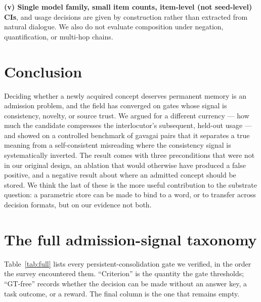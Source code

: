 \documentclass[11pt]{article}
\begin{document}
\textbf{(v) Single model family, small item counts, item-level (not seed-level) CIs}, and
usage decisions are given by construction rather than extracted from natural dialogue. We
also do not evaluate composition under negation, quantification, or multi-hop chains.

\section{Conclusion}

Deciding whether a newly acquired concept deserves permanent memory is an admission
problem, and the field has converged on gates whose signal is consistency, novelty, or
source trust. We argued for a different currency --- how much the candidate compresses the
interlocutor's subsequent, held-out usage --- and showed on a controlled benchmark of
gavagai pairs that it separates a true meaning from a self-consistent misreading where the
consistency signal is systematically inverted. The result comes with three preconditions
that were not in our original design, an ablation that would otherwise have produced a false
positive, and a negative result about where an admitted concept should be stored. We think
the last of these is the more useful contribution to the substrate question: a parametric
store can be made to bind to a word, or to transfer across decision formats, but on our
evidence not both.


\appendix
\section{The full admission-signal taxonomy}
\label{app:taxonomy}

Table~\ref{tab:full} lists every persistent-consolidation gate we verified, in the order the
survey encountered them. ``Criterion'' is the quantity the gate thresholds; ``GT-free''
records whether the decision can be made without an answer key, a task outcome, or a reward.
The final column is the one that remains empty.
\end{document}
